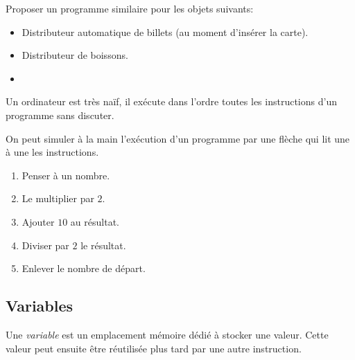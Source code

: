 \documentclass{article}
\begin{document}
\begin{exercize}
Proposer un programme similaire pour les objets suivants:
\begin{itemize}
\item Distributeur automatique de billets (au moment d'insérer la carte).
\item Distributeur de boissons.
\item 
\end{itemize}
\end{exercize}

Un ordinateur est très naïf, il exécute dans l'ordre toutes les instructions d'un programme sans discuter.

\begin{example}
On peut simuler à la main l'exécution d'un programme par une flèche qui lit une à une les instructions.
\begin{enumerate}
\item Penser à un nombre.
\item Le multiplier par $2$.
\item Ajouter $10$ au résultat.
\item Diviser par $2$ le résultat.
\item Enlever le nombre de départ.
\end{enumerate}
\end{example}

\subsection{Variables}

\begin{definition}
Une \emph{variable} est un emplacement mémoire dédié à stocker une valeur. Cette valeur peut ensuite être réutilisée plus tard par une autre instruction.
\end{definition}
\end{document}
